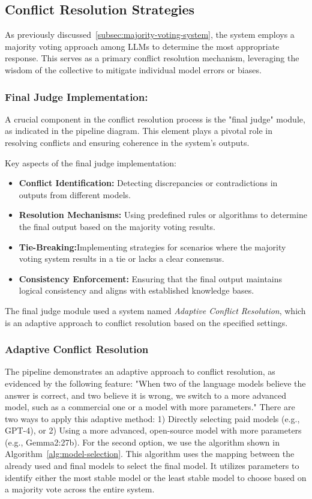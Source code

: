 \subsection{Conflict Resolution Strategies}\label{subsec:conflict-resolution-strategies}
As previously discussed~\ref{subsec:majority-voting-system}, the system employs a majority voting approach among LLMs to determine the most appropriate response.
This serves as a primary conflict resolution mechanism, leveraging the wisdom of the collective to mitigate individual model errors or biases.
\subsubsection{Final Judge Implementation:}
A crucial component in the conflict resolution process is the "final judge" module, as indicated in the pipeline diagram.
This element plays a pivotal role in resolving conflicts and ensuring coherence in the system's outputs.

Key aspects of the final judge implementation:
\begin{itemize}
    \item \textbf{Conflict Identification:} Detecting discrepancies or contradictions in outputs from different models.
    \item \textbf{Resolution Mechanisms:} Using predefined rules or algorithms to determine the final output based on the majority voting results.
    \item \textbf{Tie-Breaking:}Implementing strategies for scenarios where the majority voting system results in a tie or lacks a clear consensus.
    \item \textbf{Consistency Enforcement:} Ensuring that the final output maintains logical consistency and aligns with established knowledge bases.
\end{itemize}

The final judge module used a system named \textit{Adaptive Conflict Resolution}, which is an adaptive approach to conflict resolution based on the specified settings.

\subsubsection{Adaptive Conflict Resolution}
The pipeline demonstrates an adaptive approach to conflict resolution, as evidenced by the following feature:
"When two of the language models believe the answer is correct, and two believe it is wrong, we switch to a more advanced model, such as a commercial one or a model with more parameters."
There are two ways to apply this adaptive method: 1) Directly selecting paid models (e.g., GPT-4), or 2) Using a more advanced, open-source model with more parameters (e.g., Gemma2:27b).
For the second option, we use the algorithm shown in Algorithm~\ref{alg:model-selection}.
This algorithm uses the mapping between the already used and final models to select the final model.
It utilizes parameters to identify either the most stable model or the least stable model to choose based on a majority vote across the entire system.


